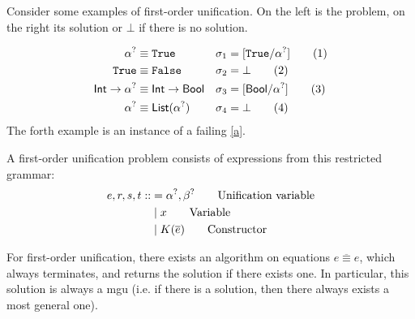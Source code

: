 \documentclass[twoside,12pt,a4paper]{article}
\begin{document}
Consider some examples of first-order unification. On the left is the problem, on the right its solution or $\bot$ if there is no solution.
\begin{example}
    \begin{align*}
        \alpha^? &\equiv \mathtt{True} &\sigma_1 &= [\mathtt{True}/\alpha^?]\tag{1}\\
        \mathtt{True} &\equiv \mathtt{False} &\sigma_2 &= \bot\tag{2}\\
        \mathsf{Int} \rightarrow \alpha^? &\equiv \mathsf{Int} \rightarrow \mathsf{Bool} &\sigma_3 &= [\mathsf{Bool}/\alpha^?]\tag{3}\\
        \alpha^?&\equiv \mathsf{List(\alpha^?)} &\sigma_4 &= \bot\tag{4}
    \end{align*}
    The forth example is an instance of a failing \ref{a}.
\end{example}

\begin{definition}
    A first-order unification problem consists of expressions from this restricted grammar:
\begin{align*}
    e,r,s,t ::&= \alpha^?, \beta^? \tag*{Unification variable}\\
    &\;|\; x\tag*{Variable} \\
    &\;|\; K(\overline{e}) \tag*{Constructor}
\end{align*}
\end{definition}

\begin{theorem}
    For first-order unification, there exists an algorithm on equations $\overline{e\equiv e}$, which always terminates, and returns the solution if there exists one. 
    In particular, this solution is always a mgu (i.e. if there is a solution, then there always exists a most general one).
\end{theorem}%
\end{document}
